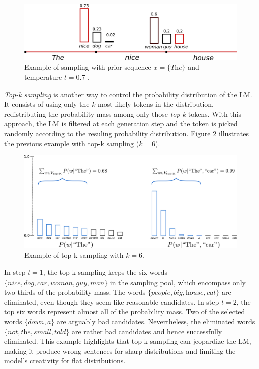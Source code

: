 \begin{figure}[!h]
 \centering
 \includegraphics[width=0.9\columnwidth]{imgs/background/temperature.png}
 \caption{Example of sampling with prior sequence $x = \{\textit{The}\}$ and temperature $t = 0.7$ \cite{platen2020}.}
 \label{fig:temp}
\end{figure}

\textit{Top-k sampling} \cite{fan2018hierarchical} is another way to control the probability distribution of the LM. It consists of using only the $k$ most likely tokens in the distribution, redistributing the probability mass among only those \textit{top-k} tokens. With this approach, the LM is filtered at each generation step and the token is picked randomly according to the resuling probability distribution. Figure \ref{fig:topk} illustrates the previous example with top-k sampling ($k=6$).

\begin{figure}[!h]
 \centering
 \includegraphics[width=0.9\columnwidth]{imgs/background/topk.png}
 \caption{Example of top-k sampling with $k=6$.}
 \label{fig:topk}
\end{figure}

In step $t=1$, the top-k sampling keeps the six words $\{\textit{nice}, \textit{dog}, \textit{car}, \textit{woman}, \textit{guy}, \textit{man}\}$ in the sampling pool, which encompass only two thirds of the probability mass. The words $\{\textit{people}, \textit{big}, \textit{house}, \textit{cat}\}$ are eliminated, even though they seem like reasonable candidates. In step $t=2$, the top six words represent almost all of the probability mass. Two of the selected words $\{\textit{down}, \textit{a}\}$ are arguably bad candidates. Nevertheless, the eliminated words $\{\textit{not}, \textit{the}, \textit{small}, \textit{told}\}$ are rather bad candidates and hence successfully eliminated. This example highlights that top-k sampling can jeopardize the LM, making it produce wrong sentences for sharp distributions and limiting the model's creativity for flat distributions.

